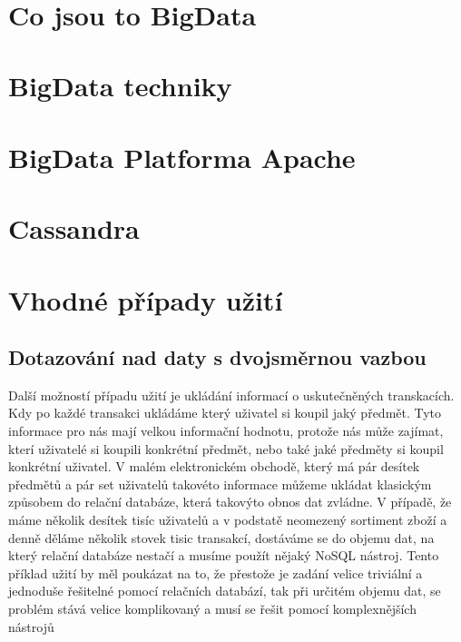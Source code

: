 \documentclass[thesis=M,czech]{FITthesis}[2012/06/26]
\title{
}
\begin{document}
	

\begin{introduction}




\end{introduction}


\chapter{Co jsou to BigData}




\chapter{BigData techniky}



\chapter{BigData Platforma Apache}



\chapter{Cassandra}	




\chapter{Vhodné případy užití}


\section{Dotazování nad daty s dvojsměrnou vazbou}
Další možností případu užití je ukládání informací o uskutečněných transkacích. Kdy po každé transakci ukládáme který uživatel si koupil jaký předmět. Tyto informace pro nás mají velkou informační hodnotu, protože nás může zajímat, kterí uživatelé si koupili konkrétní předmět, nebo také jaké předměty si koupil konkrétní uživatel. V malém elektronickém obchodě, který má pár desítek předmětů a pár set uživatelů takovéto informace můžeme ukládat klasickým způsobem do relační databáze, která takovýto obnos dat zvládne. V případě, že máme několik desítek tisíc uživatelů a v podstatě neomezený sortiment zboží a denně děláme několik stovek tisic transakcí, dostáváme se do objemu dat, na který relační databáze nestačí a musíme použít nějaký NoSQL nástroj. Tento příklad užití by měl poukázat na to, že přestože je zadání velice triviální a jednoduše řešitelné pomocí relačních databází, tak při určitém objemu dat, se problém stává velice komplikovaný a musí se řešit pomocí komplexnějších nástrojů
\end{document}
